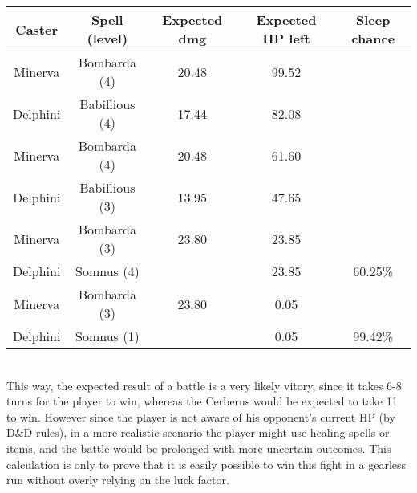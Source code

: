 \begin{tabular}{ccccc}
	\textbf{Caster} & \textbf{Spell (level)} & \textbf{Expected dmg} & \textbf{Expected HP left} & \textbf{Sleep chance} \\ \hline
	Minerva  & Bombarda (4)   & 20.48 & 99.52 &         \\
	Delphini & Babillious (4) & 17.44 & 82.08 &         \\
	Minerva  & Bombarda (4)   & 20.48 & 61.60 &         \\
	Delphini & Babillious (3) & 13.95 & 47.65 &         \\
	Minerva  & Bombarda (3)   & 23.80 & 23.85 &         \\
	Delphini & Somnus (4)     &       & 23.85 & 60.25\% \\
	Minerva  & Bombarda (3)   & 23.80 &  0.05 &         \\
	Delphini & Somnus (1)     &       &  0.05 & 99.42\% \\
\end{tabular}\\

This way, the expected result of a battle is a very likely vitory, since it takes 6-8 turns for the player to win, whereas the Cerberus would be expected to take 11 to win.
However since the player is not aware of his opponent's current HP (by D\&D rules), in a more realistic scenario the player might use healing spells or items, and the battle would be prolonged with more uncertain outcomes. This calculation is only to prove that it is easily possible to win this fight in a gearless run without overly relying on the luck factor.


